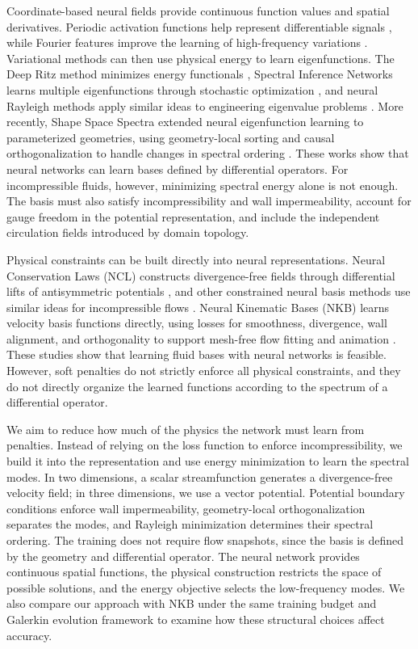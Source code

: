 Coordinate-based neural fields provide continuous function values and spatial derivatives. Periodic activation functions help represent differentiable signals \citep{sitzmann2020implicit}, while Fourier features improve the learning of high-frequency variations \citep{tancik2020fourier}. Variational methods can then use physical energy to learn eigenfunctions. The Deep Ritz method minimizes energy functionals \citep{e2018deep}, Spectral Inference Networks learns multiple eigenfunctions through stochastic optimization \citep{pfau2019spectral}, and neural Rayleigh methods apply similar ideas to engineering eigenvalue problems \citep{rowan2025rayleigh}. More recently, Shape Space Spectra extended neural eigenfunction learning to parameterized geometries, using geometry-local sorting and causal orthogonalization to handle changes in spectral ordering \citep{chang2025shapespacespectra}. These works show that neural networks can learn bases defined by differential operators. For incompressible fluids, however, minimizing spectral energy alone is not enough. The basis must also satisfy incompressibility and wall impermeability, account for gauge freedom in the potential representation, and include the independent circulation fields introduced by domain topology.

Physical constraints can be built directly into neural representations. Neural Conservation Laws (NCL) constructs divergence-free fields through differential lifts of antisymmetric potentials \citep{richterpowell2022neural}, and other constrained neural basis methods use similar ideas for incompressible flows \citep{cheng2026decoupled}. Neural Kinematic Bases (NKB) learns velocity basis functions directly, using losses for smoothness, divergence, wall alignment, and orthogonality to support mesh-free flow fitting and animation \citep{liu2025neural}. These studies show that learning fluid bases with neural networks is feasible. However, soft penalties do not strictly enforce all physical constraints, and they do not directly organize the learned functions according to the spectrum of a differential operator.

We aim to reduce how much of the physics the network must learn from penalties. Instead of relying on the loss function to enforce incompressibility, we build it into the representation and use energy minimization to learn the spectral modes. In two dimensions, a scalar streamfunction generates a divergence-free velocity field; in three dimensions, we use a vector potential. Potential boundary conditions enforce wall impermeability, geometry-local orthogonalization separates the modes, and Rayleigh minimization determines their spectral ordering. The training does not require flow snapshots, since the basis is defined by the geometry and differential operator. The neural network provides continuous spatial functions, the physical construction restricts the space of possible solutions, and the energy objective selects the low-frequency modes. We also compare our approach with NKB under the same training budget and Galerkin evolution framework to examine how these structural choices affect accuracy.

